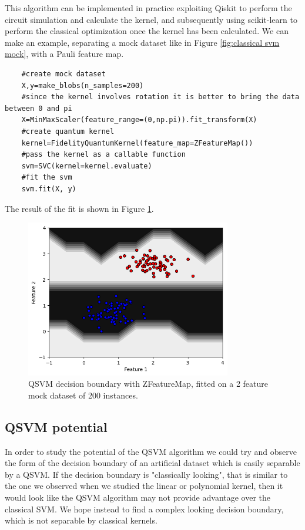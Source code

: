 \documentclass[12pt]{article}
\begin{document}
This algorithm can be implemented in practice exploiting Qiskit to perform the circuit simulation and calculate the kernel, and subsequently using scikit-learn to perform the classical optimization once the kernel has been calculated. We can make an example, separating a mock dataset like in Figure \ref{fig:classical svm mock}, with a Pauli feature map. 

\begin{lstlisting}
    #create mock dataset
    X,y=make_blobs(n_samples=200) 
    #since the kernel involves rotation it is better to bring the data between 0 and pi
    X=MinMaxScaler(feature_range=(0,np.pi)).fit_transform(X) 
    #create quantum kernel
    kernel=FidelityQuantumKernel(feature_map=ZFeatureMap()) 
    #pass the kernel as a callable function 
    svm=SVC(kernel=kernel.evaluate) 
    #fit the svm
    svm.fit(X, y) 
\end{lstlisting}

The result of the fit is shown in Figure \ref{fig:qsvm}.
\begin{figure}[h!]
    \centering
    \includegraphics[width=0.8\textwidth]{images/qsvm.png}
    \caption{QSVM decision boundary with ZFeatureMap, fitted on a 2 feature mock dataset of 200 instances.}
    \label{fig:qsvm}
\end{figure}

\subsection{QSVM potential}
In order to study the potential of the QSVM algorithm we could try and observe the form of the decision boundary of an artificial dataset which is easily separable by a QSVM. If the decision boundary is "classically looking", that is similar to the one we observed when we studied the linear or polynomial kernel, then it would look like the QSVM algorithm may not provide advantage over the classical SVM. We hope instead to find a complex looking decision boundary, which is not separable by classical kernels. 
\end{document}
